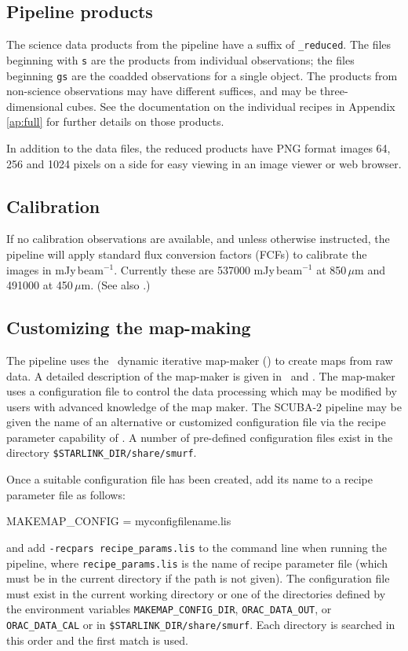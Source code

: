 \subsection{Pipeline products}

The science data products from the pipeline have a suffix of
\verb+_reduced+. The files beginning with \verb+s+ are the products
from individual observations; the files beginning \verb+gs+ are the
coadded observations for a single object. The products from
non-science observations may have different suffices, and may be
three-dimensional cubes. See the documentation on the individual
recipes in Appendix\,\ref{ap:full} for further details on those
products.

In addition to the data files, the reduced products have PNG format
images 64, 256 and 1024 pixels on a side for easy viewing in an image
viewer or web browser.

\subsection{Calibration\label{sse:cal}}

If no calibration observations are available, and unless otherwise
instructed, the pipeline will apply standard flux conversion factors
(FCFs) to calibrate the images in mJy\,beam$^{-1}$. Currently these
are 537000 mJy\,beam$^{-1}$ at 850\,$\mu$m and 491000 at
450\,$\mu$m. (See also \cite{scuba2calpaper}.)

\subsection{Customizing the map-making}

The pipeline uses the \SMURF\ dynamic iterative map-maker (\makemap)
to create maps from raw data. A detailed description of the map-maker
is given in \SMURFcook\ and \cite{smurfpaper}. The map-maker uses a
configuration file to control the data processing which may be
modified by users with advanced knowledge of the map maker. The
SCUBA-2 pipeline may be given the name of an alternative or customized
configuration file via the recipe parameter capability of \oracdr. A
number of pre-defined configuration files exist in the directory
\verb+$STARLINK_DIR/share/smurf+.

Once a suitable configuration file has been created, add its name to a
recipe parameter file as follows:
\begin{terminalv}
MAKEMAP_CONFIG = myconfigfilename.lis
\end{terminalv}
and add \texttt{-recpars recipe\_params.lis} to the command line when
running the pipeline, where \verb+recipe_params.lis+ is the name of
recipe parameter file (which must be in the current directory if the
path is not given). The  configuration file must exist
in the current working directory or one of the directories defined by
the environment variables \verb+MAKEMAP_CONFIG_DIR+,
\verb+ORAC_DATA_OUT+, or \verb+ORAC_DATA_CAL+ or in
\verb+$STARLINK_DIR/share/smurf+. Each directory is searched in this
order and the first match is used.

